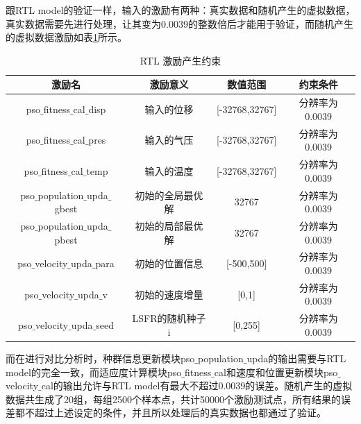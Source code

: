 跟RTL model的验证一样，输入的激励有两种：真实数据和随机产生的虚拟数据，真实数据需要先进行处理，让其变为0.0039的整数倍后才能用于验证，而随机产生的虚拟数据激励如表\ref{tab:RTL激励产生约束}所示。
\begin{table}[H]
    \centering
    \caption{RTL 激励产生约束}
    \label{tab:RTL激励产生约束}
    \begin{tabular}{c|c|c|c}
        \hline
        激励名                                    & 激励意义                   &  数值范围            & 约束条件  \\ \hline
        pso$\_$fitness$\_$cal$\_$disp            & 输入的位移                  &  [-32768,32767]     & 分辨率为0.0039      \\ \hline
        pso$\_$fitness$\_$cal$\_$pres            & 输入的气压                  &  [-32768,32767]     & 分辨率为0.0039      \\ \hline
        pso$\_$fitness$\_$cal$\_$temp            & 输入的温度                  &  [-32768,32767]     & 分辨率为0.0039      \\ \hline
        pso$\_$population$\_$upda$\_$gbest       & 初始的全局最优解            &  32767              & 分辨率为0.0039       \\ \hline
        pso$\_$population$\_$upda$\_$pbest       & 初始的局部最优解            &  32767              & 分辨率为0.0039       \\ \hline
        pso$\_$velocity$\_$upda$\_$para         & 初始的位置信息               & [-500,500]          & 分辨率为0.0039      \\ \hline
        pso$\_$velocity$\_$upda$\_$v            & 初始的速度增量               & [0,1]               & 分辨率为0.0039       \\ \hline
        pso$\_$velocity$\_$upda$\_$seed         & LSFR的随机种子i              & [0,255]             & 分辨率为0.0039     \\ \hline
    \end{tabular}
  \end{table}

而在进行对比分析时，种群信息更新模块pso$\_$population$\_$upda的输出需要与RTL model的完全一致，而适应度计算模块pso$\_$fitness$\_$cal和速度和位置更新模块pso$\_$velocity$\_$cal的输出允许与RTL model有最大不超过0.0039的误差。随机产生的虚拟数据共生成了20组，每组2500个样本点，共计50000个激励测试点，所有结果的误差都不超过上述设定的条件，并且所以处理后的真实数据也都通过了验证。

